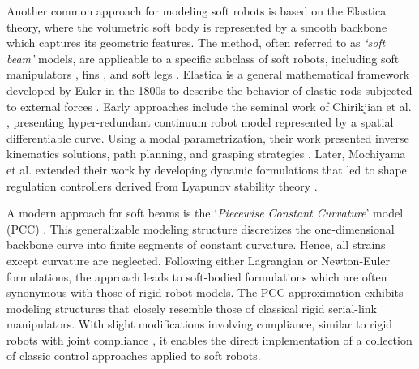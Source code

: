 Another common approach for modeling soft robots is based on the Elastica theory, where the volumetric soft body is represented by a smooth backbone which captures its geometric features. The method, often referred to as \emph{`soft beam'} models, are applicable to a specific subclass of soft robots, including soft manipulators \cite{Falkenhahn2015,Marchese2016,Jones2006,Webster2010}, fins \cite{Katzschmann2019,Marchese2014}, and soft legs \cite{Drotman2021Feb,vanLaake2022Sep}. Elastica is a general mathematical framework developed by Euler in the 1800s to describe the behavior of elastic rods subjected to external forces \cite{Levien2008,Antman2005}. Early approaches include the seminal work of Chirikjian et al. \cite{Chirikjian1989,Chirikjian1991,Chirikjian1992}, presenting hyper-redundant continuum robot model represented by a spatial differentiable curve. Using a modal parametrization, their work presented inverse kinematics solutions, path planning, and grasping strategies \cite{Chirikjian1992}. Later, Mochiyama et al. \cite{Mochiyama1992,Mochiyama1999} extended their work by developing dynamic formulations that led to shape regulation controllers derived from Lyapunov stability theory \cite{Khalil2014Feb}. 

A modern approach for soft beams is the `\emph{Piecewise Constant Curvature}' model (PCC) \cite{Webster2010}. This generalizable modeling structure discretizes the one-dimensional backbone curve into finite segments of constant curvature. Hence, all strains except curvature are neglected. Following either Lagrangian or Newton-Euler formulations, the approach leads to soft-bodied formulations which are often synonymous with those of rigid robot models. The PCC approximation exhibits modeling structures that closely resemble those of classical rigid serial-link manipulators. With slight modifications involving compliance, similar to rigid robots with joint compliance \cite{DeLuca2016Jul,Lynch2017}, it enables the direct implementation of a collection of classic control approaches \cite{Katzschmann2018,DellaSantina2020,Franco2020,Franco2022May,Jones2006,Kazemipour2022May,Godage2015,Godage2016} applied to soft robots.

